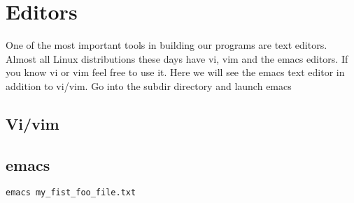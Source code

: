 \documentclass[aps,showpacs,prd,notitlepage,preprintnumbers,amsmath,amssymb,letterpaper]{revtex4}
\begin{document}
\section{Editors}

One of the most important tools in building our programs are text
editors.  Almost all Linux distributions these days have vi, vim and
the emacs editors.  If you know vi or vim feel free to use it. Here we
will see the emacs text editor in addition to vi/vim. Go into the subdir directory and
launch emacs

\subsection{Vi/vim}



\subsection{emacs}
\begin{verbatim}
emacs my_fist_foo_file.txt
\end{verbatim}
\end{document}
